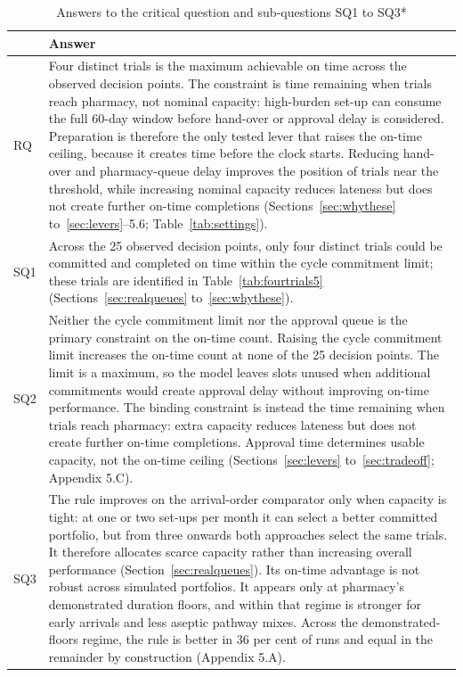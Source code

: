 \begin{table}[htbp]
  \centering
  \caption{Answers to the critical question and sub-questions SQ1 to SQ3*}
  \label{tab:answers}
  \begin{tabularx}{\textwidth}{@{}LL@{}}
    \toprule
    \textbf{} & \textbf{Answer} \\
    \midrule
    RQ & Four distinct trials is the maximum achievable on time across the observed decision points. The constraint is time remaining when trials reach pharmacy, not nominal capacity: high-burden set-up can consume the full 60-day window before hand-over or approval delay is considered. Preparation is therefore the only tested lever that raises the on-time ceiling, because it creates time before the clock starts. Reducing hand-over and pharmacy-queue delay improves the position of trials near the threshold, while increasing nominal capacity reduces lateness but does not create further on-time completions (Sections~\ref{sec:whythese} to~\ref{sec:levers}--5.6; Table~\ref{tab:settings}). \\
    \addlinespace
    SQ1 & Across the 25 observed decision points, only four distinct trials could be committed and completed on time within the cycle commitment limit; these trials are identified in Table~\ref{tab:fourtrials5} (Sections~\ref{sec:realqueues} to~\ref{sec:whythese}). \\
    \addlinespace
    SQ2 & Neither the cycle commitment limit nor the approval queue is the primary constraint on the on-time count. Raising the cycle commitment limit increases the on-time count at none of the 25 decision points. The limit is a maximum, so the model leaves slots unused when additional commitments would create approval delay without improving on-time performance. The binding constraint is instead the time remaining when trials reach pharmacy: extra capacity reduces lateness but does not create further on-time completions. Approval time determines usable capacity, not the on-time ceiling (Sections~\ref{sec:levers} to~\ref{sec:tradeoff}; Appendix 5.C). \\
    \addlinespace
    SQ3 & The rule improves on the arrival-order comparator only when capacity is tight: at one or two set-ups per month it can select a better committed portfolio, but from three onwards both approaches select the same trials. It therefore allocates scarce capacity rather than increasing overall performance (Section~\ref{sec:realqueues}). Its on-time advantage is not robust across simulated portfolios. It appears only at pharmacy's demonstrated duration floors, and within that regime is stronger for early arrivals and less aseptic pathway mixes. Across the demonstrated-floors regime, the rule is better in 36 per cent of runs and equal in the remainder by construction (Appendix 5.A). \\
    \bottomrule
  \end{tabularx}
\end{table}

